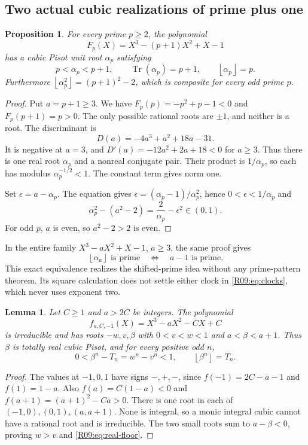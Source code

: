 \documentclass[11pt,a4paper]{article}
\newtheorem{lemma}[theorem]{Lemma}\newtheorem{proposition}[theorem]{Proposition}
\theoremstyle{definition}\newtheorem{definition}[theorem]{Definition}
\theoremstyle{remark}\newtheorem{remark}[theorem]{Remark}
\newcommand{\floor}[1]{\left\lfloor#1\right\rfloor}
\DeclareMathOperator{\Tr}{Tr}\DeclareMathOperator{\tr}{tr}\DeclareMathOperator{\Nm}{N}
\begin{document}
\subsection{Two actual cubic realizations of prime plus one}

\begin{proposition}\label{R09:prop:unit}
For every prime $p\ge2$, the polynomial
\[
 F_p(X)=X^3-(p+1)X^2+X-1
\]
has a cubic Pisot unit root $\alpha_p$ satisfying
\[
 p<\alpha_p<p+1,\qquad \Tr(\alpha_p)=p+1,
 \qquad \floor{\alpha_p}=p.
\]
Furthermore $\floor{\alpha_p^2}=(p+1)^2-2$, which is composite for every
odd prime $p$.
\end{proposition}
\begin{proof}
Put $a=p+1\ge3$. We have $F_p(p)=-p^2+p-1<0$ and $F_p(p+1)=p>0$.
The only possible rational roots are $\pm1$, and neither is a root.
The discriminant is
\[
 D(a)=-4a^3+a^2+18a-31.
\]
It is negative at $a=3$, and $D'(a)=-12a^2+2a+18<0$ for $a\ge3$.
Thus there is one real root $\alpha_p$ and a nonreal conjugate pair.
Their product is $1/\alpha_p$, so each has modulus
$\alpha_p^{-1/2}<1$. The constant term gives norm one.

Set $\epsilon=a-\alpha_p$. The equation gives
$\epsilon=(\alpha_p-1)/\alpha_p^2$, hence $0<\epsilon<1/\alpha_p$ and
\[
 \alpha_p^2-(a^2-2)=\frac2{\alpha_p}-\epsilon^2\in(0,1).
\]
For odd $p$, $a$ is even, so $a^2-2>2$ is even.
\end{proof}

In the entire family $X^3-aX^2+X-1$, $a\ge3$, the same proof gives
\[
 \floor{\alpha_a}\text{ is prime}\quad\Longleftrightarrow\quad a-1
 \text{ is prime}.
\]
This exact equivalence realizes the shifted-prime idea without any
prime-pattern theorem. Its square calculation does not settle either
clock in \eqref{R09:eq:clocks}, which never uses exponent two.

\begin{lemma}\label{R09:lem:real}
Let $C\ge1$ and $a>2C$ be integers. The polynomial
\[
 f_{a,C,-1}(X)=X^3-aX^2-CX+C
\]
is irreducible and has roots $-w,v,\beta$ with
$0<v<w<1$ and $a<\beta<a+1$. Thus $\beta$ is totally real cubic Pisot,
and for every positive odd $n$,
\begin{equation}\label{R09:eq:real-floor}
 0<\beta^n-T_n=w^n-v^n<1,\qquad \floor{\beta^n}=T_n.
\end{equation}
\end{lemma}
\begin{proof}
The values at $-1,0,1$ have signs $-,+,-$, since
$f(-1)=2C-a-1$ and $f(1)=1-a$. Also $f(a)=C(1-a)<0$ and
$f(a+1)=(a+1)^2-Ca>0$. There is one root in each of
$(-1,0),(0,1),(a,a+1)$. None is integral, so a monic integral cubic
cannot have a rational root and is irreducible. The two small roots
sum to $a-\beta<0$, proving $w>v$ and \eqref{R09:eq:real-floor}.
\end{proof}
\end{document}
